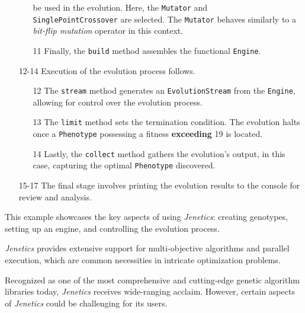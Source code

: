 \begin{enumerate}
\begin{enumerate}
          be used in the evolution.
          Here, the \texttt{Mutator} and \\\texttt{SinglePointCrossover} are 
          selected.
          The \texttt{Mutator} behaves similarly to a \textit{bit-flip 
          mutation} operator in this context.
        \item[11] Finally, the \texttt{build} method assembles the functional 
          \texttt{Engine}.
      \end{enumerate}
    \item[12-14] Execution of the evolution process follows.
      \begin{enumerate}
        \item[12] The \texttt{stream} method generates an 
          \texttt{EvolutionStream} from the \texttt{Engine}, allowing for 
          control over the evolution process.
        \item[13] The \texttt{limit} method sets the termination condition.
          The evolution halts once a \texttt{Phenotype} possessing a fitness 
          \textbf{exceeding} 19 is located.
        \item[14] Lastly, the \texttt{collect} method gathers the evolution's 
          output, in this case, capturing the optimal \texttt{Phenotype} 
          discovered.
      \end{enumerate}
    \item[15-17] The final stage involves printing the evolution results to the 
      console for review and analysis.
  \end{enumerate}

  This example showcases the key aspects of using \textit{Jenetics}: creating 
  genotypes, setting up an engine, and controlling the evolution process.

  \textit{Jenetics} provides extensive support for multi-objective algorithms 
  and parallel execution, which are common necessities in intricate optimization
  problems.

  Recognized as one of the most comprehensive and cutting-edge genetic 
  algorithm libraries today, \textit{Jenetics} receives wide-ranging acclaim. 
  However, certain aspects of \textit{Jenetics} could be challenging for its 
  users.

